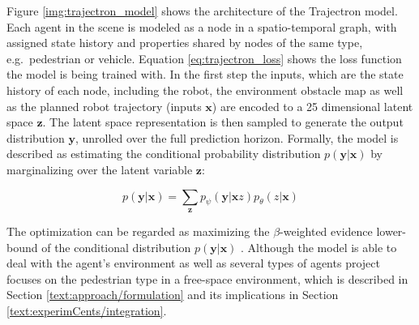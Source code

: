 Figure \ref{img:trajectron_model} shows the architecture of the Trajectron model. Each agent in the scene is modeled as a node in a spatio-temporal graph, with assigned state history and properties shared by nodes of the same type, e.g.\ pedestrian or vehicle. Equation \ref{eq:trajectron_loss} shows the loss function the model is being trained with. In the first step the inputs, which are the state history of each node, including the robot, the environment obstacle map as well as the planned robot trajectory (inputs $\boldsymbol{x}$) are encoded to a 25 dimensional latent space $\boldsymbol{z}$. The latent space representation is then sampled to generate the output distribution $\boldsymbol{y}$, unrolled over the full prediction horizon. Formally, the model is described as estimating the conditional probability distribution $p(\boldsymbol{y}|\boldsymbol{x})$ by marginalizing over the latent variable $\boldsymbol{z}$:

\begin{equation}
p(\boldsymbol{y}|\boldsymbol{x}) = \sum_{\boldsymbol{z}} p_{\psi} (\boldsymbol{y} | \boldsymbol{x} z) p_{\theta}(z | \boldsymbol{x})
\end{equation}

The optimization can be regarded as maximizing the $\beta$-weighted evidence lower-bound of the conditional distribution $p(\boldsymbol{y}|\boldsymbol{x})$ \cite{Ivanovic2018}. Although the model is able to deal with the agent's environment as well as several types of agents project \project focuses on the pedestrian type in a free-space environment, which is described in Section \ref{text:approach/formulation} and its implications in Section \ref{text:experimCents/integration}.

